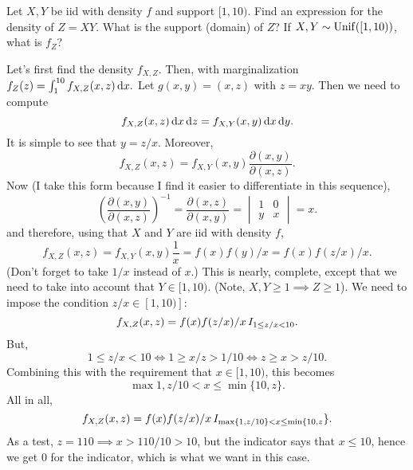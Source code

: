 \begin{exercise}
Let $X,Y$ be iid with density $f$ and support $[1,10)$. Find an expression for the density of $Z=X Y$. What is the support (domain) of $Z$? If $X,Y\sim\mathrm{Unif}([1,10))$, what is $f_{Z}$?
\begin{solution}
Let's first find the density $f_{X,Z}$. Then, with marginalization $f_{Z}(z) = \int_{1}^{10} f_{X,Z}(x,z) \,\textrm{d}x.$
Let $g(x,y) = (x, z)$ with $z=x y$. Then we need to compute
\begin{equation}
\label{eq:20}
f_{X,Z}(x,z) \,\textrm{d}x \,\textrm{d}z =
f_{X,Y}(x,y) \,\textrm{d}x \,\textrm{d}y.
\end{equation}
It is simple to see that $y=z/x$. Moreover,
\begin{equation}
f_{X,Z}(x,z)  = f_{X,Y}(x,y) \frac{\partial(x,y)}{\partial(x, z)}.
\end{equation}
Now (I take this form because I find it easier to differentiate in this sequence),
\begin{equation}
\label{eq:19}
\left(\frac{\partial(x,y)}{\partial(x,z)}\right)^{-1} =
\frac{\partial(x,z)}{\partial(x,y)} =
\begin{vmatrix}
  1 & 0 \\
y & x
\end{vmatrix} = x.
\end{equation}
and therefore, using that $X$ and $Y$ are iid with density $f$,
\begin{equation}
f_{X,Z}(x,z)  = f_{X,Y}(x,y) \frac{1}{x} = f(x)f(y)/x = f(x)f(z/x)/ x.
\end{equation}
(Don't forget to take $1/x$ instead of $x$.)
This is nearly, complete, except that we need to take into account that $Y\in [1,10)$.
(Note, $X,Y\geq 1 \implies Z\geq 1$).
We need to impose the condition $z/x \in [1, 10)]$:
\begin{equation}
f_{X,Z}(x,z)  = f(x)f(z/x)/ x \,I_{1\leq z/x <10}.
\end{equation}
But,
\begin{equation}
\label{eq:22}
1\leq z/x < 10 \iff 1 \geq x/z > 1/10 \iff z \geq x > z/10.
\end{equation}
Combining this with the requirement that $x\in [1, 10)$,  this becomes
\begin{equation}
\max{1, z/10} < x \leq \min\{10, z\}.
\end{equation}
All in all,
\begin{equation}
f_{X,Z}(x,z)  = f(x)f(z/x)/ x \,I_{\max\{1, z/10\}< x \leq \min\{10, z}\}.
\end{equation}
As a test, $z=110 \implies x > 110/10 > 10$, but the indicator says that $x\leq 10$, hence we get 0 for the indicator, which is what we want in this case.



\end{solution}
\end{exercise}
